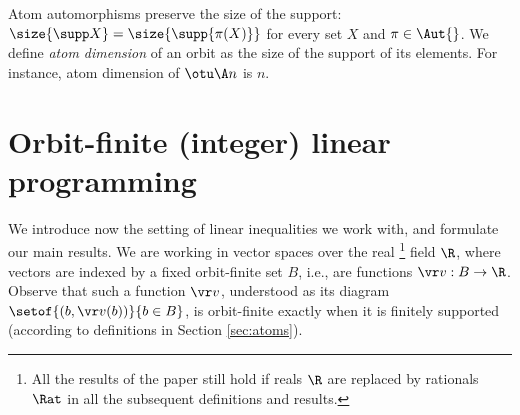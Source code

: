 Atom automorphisms preserve the size of the support: $\size{\supp X} = \size{\supp{\pi(X)}}$ for every set $X$ and
$\pi\in\Aut{}$.
We define \emph{atom dimension} of an orbit as the size of the support of its elements.
For instance, atom dimension of $\otu \A n$ is $n$.






\section{Orbit-finite (integer) linear programming} 
\label{sec:problems}
\label{sec: linear eq}






We introduce now the setting of linear inequalities we work with, and formulate our main results. 
%
We are working in vector spaces over the real%
\footnote{
All the results of the paper still hold if reals $\R$ are replaced by rationals $\Rat$
in all the subsequent definitions and results.
}
field $\R$,
where vectors are indexed by a fixed orbit-finite set $B$, i.e., are functions $\vr v : B\to\R$.
Observe that such a function $\vr v$, understood as its diagram $\setof{(b, \vr v(b))}{b\in B}$,
is orbit-finite exactly when it is finitely supported
(according to definitions in Section \ref{sec:atoms}).

